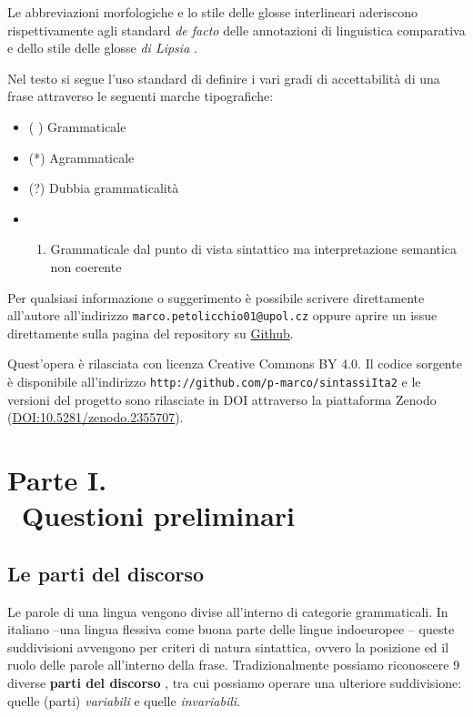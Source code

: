 \documentclass[a4paper,twoside,11pt,chapterprefix=false,bibliography=totocnumbered,listof=flat]{scrbook}
\providecommand{\tightlist}{%
  \setlength{\itemsep}{0pt}\setlength{\parskip}{0pt}}
\begin{document}
Le abbreviazioni morfologiche e lo stile delle glosse interlineari
aderiscono rispettivamente agli standard \emph{de facto} delle
annotazioni di linguistica comparativa
\citep[\href{http://www.oxfordhandbooks.com/view/10.1093/oxfordhb/9780199549368.001.0001/oxfordhb-9780199549368}{consultabile
online}]{boeckxListOfAbbreviations} e dello stile delle glosse \emph{di
Lipsia} \citep{leipzigGlossingRules}.

Nel testo si segue l'uso standard di definire i vari gradi di
accettabilità di una frase attraverso le seguenti marche tipografiche:

\begin{itemize}
\item
  ( ) Grammaticale
\item
  (*) Agrammaticale
\item
  (?) Dubbia grammaticalità
\item
  \begin{enumerate}
  \def\labelenumi{(\arabic{enumi})}
  \tightlist
  \item
    Grammaticale dal punto di vista sintattico ma interpretazione
    semantica non coerente
  \end{enumerate}
\end{itemize}

Per qualsiasi informazione o suggerimento è possibile scrivere
direttamente all'autore all'indirizzo
\texttt{marco.petolicchio01@upol.cz} oppure aprire un issue direttamente
sulla pagina del repository su
\href{http://github.com/p-marco/sintassiIta2}{Github}.

Quest'opera è rilasciata con licenza Creative Commons BY 4.0. Il codice
sorgente è disponibile all'indirizzo
\texttt{http://github.com/p-marco/sintassiIta2} e le versioni del
progetto sono rilasciate in DOI attraverso la piattaforma Zenodo
(\url{DOI:10.5281/zenodo.2355707}).

\mainmatter

\part*{Parte I. \\\ Questioni preliminari}

\hypertarget{le-parti-del-discorso}{%
\chapter{Le parti del discorso}\label{le-parti-del-discorso}}

Le parole di una lingua vengono divise all'interno di categorie
grammaticali. In italiano --una lingua flessiva come buona parte delle
lingue indoeuropee \citep{graffiScalise2009}-- queste suddivisioni
avvengono per criteri di natura sintattica, ovvero la posizione ed il
ruolo delle parole all'interno della frase. Tradizionalmente possiamo
riconoscere 9 diverse \textbf{parti del discorso} \citep{salvi2013}, tra
cui possiamo operare una ulteriore suddivisione: quelle (parti)
\emph{variabili} e quelle \emph{invariabili}.
\end{document}
